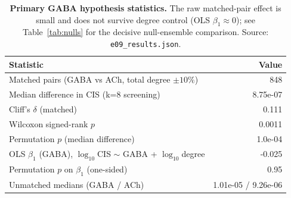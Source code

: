 \begin{table}[htbp]
\centering
\small
\caption{\textbf{Primary GABA hypothesis statistics.} The raw matched-pair effect is small and does not survive degree control (OLS $\beta_1\approx 0$); see Table~\ref{tab:nulls} for the decisive null-ensemble comparison. Source: \texttt{e09\_results.json}.}\label{tab:gaba}
\begin{tabular}{lr}
\hline
\textbf{Statistic} & \textbf{Value} \\
\hline
Matched pairs (GABA vs ACh, total degree $\pm10\%$) & 848 \\
Median difference in CIS (k=8 screening) & 8.75e-07 \\
Cliff's $\delta$ (matched) & 0.111 \\
Wilcoxon signed-rank $p$ & 0.0011 \\
Permutation $p$ (median difference) & 1.0e-04 \\
OLS $\beta_1$ (GABA), $\log_{10}$CIS $\sim$ GABA + $\log_{10}$degree & -0.025 \\
Permutation $p$ on $\beta_1$ (one-sided) & 0.95 \\
Unmatched medians (GABA / ACh) & 1.01e-05 / 9.26e-06 \\
\hline
\end{tabular}
\end{table}
